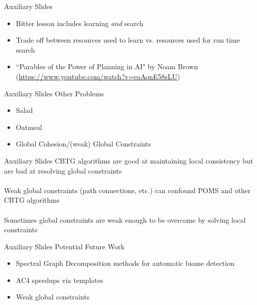 \documentclass{beamer}
\begin{document}
  \begin{frame}[fragile]{Auxiliary Slides}
    \begin{itemize}
      \item Bitter lesson includes learning \textit{and} search
      \item Trade off between resources used to learn vs. resources used for run time search
      \item ``Parables of the Power of Planning in AI" by Noam Brown (\url{https://www.youtube.com/watch?v=eaAonE58sLU})
    \end{itemize}
  \end{frame}

  \begin{frame}[fragile]{Auxiliary Slides}
    Other Problems

    \begin{itemize}
      \item Salad
      \item Oatmeal
      \item Global Cohesion/(weak) Global Constraints
    \end{itemize}
  \end{frame}

  \begin{frame}[fragile]{Auxiliary Slides}
    CBTG algorithms are good at maintaining local consistency but are bad at resolving global constraints \\
    \hfill \\
    Weak global constraints (path connections, etc.) can confound POMS and other CBTG algorithms \\
    \hfill \\
    Sometimes global constraints are weak enough to be overcome by solving local constraints
  \end{frame}


  \begin{frame}[fragile]{Auxiliary Slides}
    Potential Future Work

    \begin{itemize}
      \item Spectral Graph Decomposition methods for automatic biome detection
      \item AC4 speedups via templates
      \item Weak global constraints
    \end{itemize}
  \end{frame}
\end{document}
